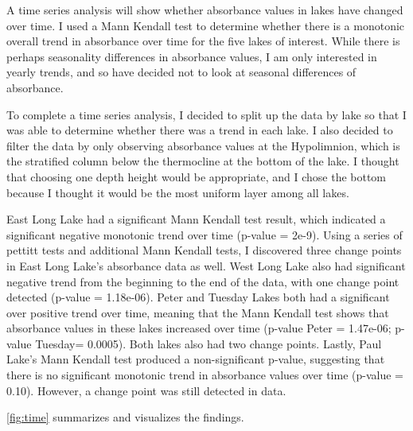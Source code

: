 \documentclass[12pt,]{article}
\newenvironment{Shaded}{\begin{snugshade}}{\end{snugshade}}
\newcommand{\KeywordTok}[1]{\textcolor[rgb]{0.13,0.29,0.53}{\textbf{#1}}}
\newcommand{\StringTok}[1]{\textcolor[rgb]{0.31,0.60,0.02}{#1}}
\newcommand{\CommentTok}[1]{\textcolor[rgb]{0.56,0.35,0.01}{\textit{#1}}}
\newcommand{\OperatorTok}[1]{\textcolor[rgb]{0.81,0.36,0.00}{\textbf{#1}}}
\newcommand{\NormalTok}[1]{#1}
\begin{document}
A time series analysis will show whether absorbance values in lakes have
changed over time. I used a Mann Kendall test to determine whether there
is a monotonic overall trend in absorbance over time for the five lakes
of interest. While there is perhaps seasonality differences in
absorbance values, I am only interested in yearly trends, and so have
decided not to look at seasonal differences of absorbance.

To complete a time series analysis, I decided to split up the data by
lake so that I was able to determine whether there was a trend in each
lake. I also decided to filter the data by only observing absorbance
values at the Hypolimnion, which is the stratified column below the
thermocline at the bottom of the lake. I thought that choosing one depth
height would be appropriate, and I chose the bottom because I thought it
would be the most uniform layer among all lakes.

East Long Lake had a significant Mann Kendall test result, which
indicated a significant negative monotonic trend over time (p-value =
2e-9). Using a series of pettitt tests and additional Mann Kendall
tests, I discovered three change points in East Long Lake's absorbance
data as well. West Long Lake also had significant negative trend from
the beginning to the end of the data, with one change point detected
(p-value = 1.18e-06). Peter and Tuesday Lakes both had a significant
over positive trend over time, meaning that the Mann Kendall test shows
that absorbance values in these lakes increased over time (p-value Peter
= 1.47e-06; p-value Tuesday= 0.0005). Both lakes also had two change
points. Lastly, Paul Lake's Mann Kendall test produced a non-significant
p-value, suggesting that there is no significant monotonic trend in
absorbance values over time (p-value = 0.10). However, a change point
was still detected in data.

\autoref{fig:time} summarizes and visualizes the findings.

\begin{Shaded}
\end{Shaded}
\end{document}
